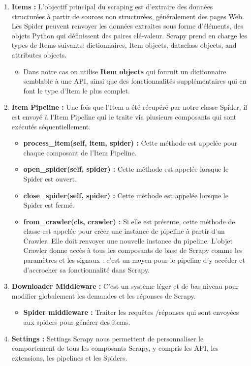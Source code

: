 \begin{enumerate}
\begin{figure}[H]
        \end{figure}
    \item\textbf{Items :} L'objectif principal du scraping est d'extraire des données structurées à partir de sources non structurées, généralement des pages Web. Les Spider peuvent renvoyer les données extraites sous forme d'éléments, des objets Python qui définissent des paires clé-valeur.
    Scrapy prend en charge les types de Items suivants: dictionnaires, Item objects, dataclass objects, and attributes objects.
    \begin{itemize}[label=,font=\normalsize]
        \addtolength{\itemindent}{0cm}
        \item Dans notre cas on utilise \textbf{Item objects} qui fournit un dictionnaire semblable à une API, ainsi que des fonctionnalités supplémentaires qui en font le type d'Item le plus complet.
\end{itemize}
\item\textbf{Item Pipeline :} Une fois que l’Item a été récupéré par notre classe Spider, il est envoyé à l’Item Pipeline qui le traite via plusieurs composants qui sont exécutés séquentiellement.
\begin{itemize}[label=,font=\normalsize]
        \addtolength{\itemindent}{0cm}
        \item\textbf{process\_item(self, item, spider) :} Cette méthode est appelée pour chaque composant de l’Item Pipeline.
        \item\textbf{open\_spider(self, spider) :} Cette méthode est appelée lorsque le Spider est ouvert.
        \item\textbf{close\_spider(self, spider) :} Cette méthode est appelée lorsque le Spider est fermé.
        \item\textbf{from\_crawler(cls, crawler) :} Si elle est présente, cette méthode de classe est appelée pour créer une instance de pipeline à partir d'un Crawler. Elle doit renvoyer une nouvelle instance du pipeline. L'objet Crawler donne accès à tous les composants de base de Scrapy comme les paramètres et les signaux : c'est un moyen pour le pipeline d'y accéder et d'accrocher sa fonctionnalité dans Scrapy.
        \end{itemize}
\item\textbf{Downloader Middleware :} C'est un système léger et de bas niveau pour modifier globalement les demandes et les réponses de Scrapy.
\begin{itemize}[label=,font=\normalsize]
        \addtolength{\itemindent}{0cm}
        \item\textbf{Spider middleware :} Traiter les requêtes /réponses qui sont envoyées aux spiders pour générer des items.
        \end{itemize} 
\item\textbf{Settings :} Settings Scrapy nous permettent de personnaliser le comportement de tous les composants Scrapy, y compris les API, les extensions, les pipelines et les Spiders.\\
\end{enumerate}
